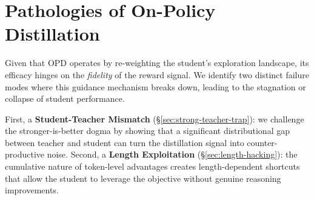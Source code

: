 \documentclass[11pt]{article}
\begin{document}



\section{Pathologies of On-Policy Distillation}
\label{sec:diagnosis}
Given that OPD operates by re-weighting the student’s exploration landscape, its efficacy hinges on the \textit{fidelity} of the reward signal. 
We identify two distinct failure modes where this guidance mechanism breaks down, leading to the stagnation or collapse of student performance. 

First, a \textbf{Student-Teacher Mismatch} (\S\ref{sec:strong-teacher-trap}): we challenge the stronger-is-better dogma by showing that a significant distributional gap between teacher and student can turn the distillation signal into counter-productive noise. 
Second, a \textbf{Length Exploitation} (\S\ref{sec:length-hacking}): the cumulative nature of token-level advantages creates length-dependent shortcuts that allow the student to leverage the objective without genuine reasoning improvements.

\end{document}
